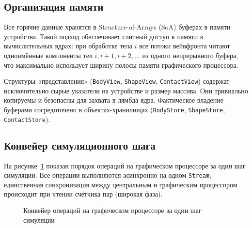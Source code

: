 \subsection{Организация памяти}

Все горячие данные хранятся в Structure-of-Arrays (SoA) буферах в памяти устройства. Такой подход обеспечивает 
слитный доступ к памяти в вычислительных ядрах: при обработке тела $i$ все потоки вейвфронта читают одноимённые
компоненты тел $i, i{+}1, i{+}2, \ldots$ из одного непрерывного буфера, что максимально использует ширину
полосы памяти графического процессора.

Структуры-«представления» (\texttt{BodyView}, \texttt{ShapeView}, \texttt{ContactView}) содержат исключительно 
сырые указатели на устройстве и размер массива. Они тривиально копируемы и безопасны для захвата в 
лямбда-ядра. Фактическое владение буферами сосредоточено в объектах-хранилищах (\texttt{BodyStore}, 
\texttt{ShapeStore}, \texttt{ContactStore}).

\subsection{Конвейер симуляционного шага}

На рисунке~\ref{fig:gpu_sim_pipeline} показан порядок операций на графическом процессоре за один шаг симуляции. Все операции
выполняются асинхронно на одном \texttt{Stream}; единственная синхронизация между центральным и графическим процессором происходит при чтении 
счётчика пар (широкая фаза).

\begin{figure}[h]
\centering
{}
\caption{Конвейер операций на графическом процессоре за один шаг симуляции}
\label{fig:gpu_sim_pipeline}
\end{figure}

